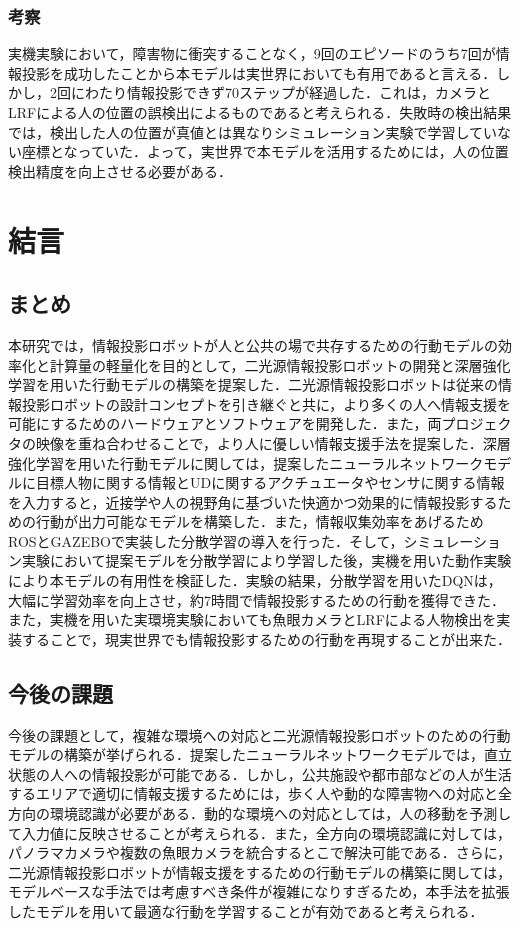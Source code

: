 \documentclass[12pt]{sonota/aislab}
\begin{document}
\subsection{考察}
実機実験において，障害物に衝突することなく，9回のエピソードのうち7回が情報投影を成功したことから本モデルは実世界においても有用であると言える．しかし，2回にわたり情報投影できず70ステップが経過した．これは，カメラとLRFによる人の位置の誤検出によるものであると考えられる．失敗時の検出結果では，検出した人の位置が真値とは異なりシミュレーション実験で学習していない座標となっていた．よって，実世界で本モデルを活用するためには，人の位置検出精度を向上させる必要がある．

\chapter{結言}
\section{まとめ}
本研究では，情報投影ロボットが人と公共の場で共存するための行動モデルの効率化と計算量の軽量化を目的として，二光源情報投影ロボットの開発と深層強化学習を用いた行動モデルの構築を提案した．二光源情報投影ロボットは従来の情報投影ロボットの設計コンセプトを引き継ぐと共に，より多くの人へ情報支援を可能にするためのハードウェアとソフトウェアを開発した．また，両プロジェクタの映像を重ね合わせることで，より人に優しい情報支援手法を提案した．深層強化学習を用いた行動モデルに関しては，提案したニューラルネットワークモデルに目標人物に関する情報とUDに関するアクチュエータやセンサに関する情報を入力すると，近接学や人の視野角に基づいた快適かつ効果的に情報投影するための行動が出力可能なモデルを構築した．また，情報収集効率をあげるためROSとGAZEBOで実装した分散学習の導入を行った．そして，シミュレーション実験において提案モデルを分散学習により学習した後，実機を用いた動作実験により本モデルの有用性を検証した．実験の結果，分散学習を用いたDQNは，大幅に学習効率を向上させ，約7時間で情報投影するための行動を獲得できた．また，実機を用いた実環境実験においても魚眼カメラとLRFによる人物検出を実装することで，現実世界でも情報投影するための行動を再現することが出来た．

\section{今後の課題}
今後の課題として，複雑な環境への対応と二光源情報投影ロボットのための行動モデルの構築が挙げられる．提案したニューラルネットワークモデルでは，直立状態の人への情報投影が可能である．しかし，公共施設や都市部などの人が生活するエリアで適切に情報支援するためには，歩く人や動的な障害物への対応と全方向の環境認識が必要がある．動的な環境への対応としては，人の移動を予測して入力値に反映させることが考えられる．また，全方向の環境認識に対しては，パノラマカメラや複数の魚眼カメラを統合するとこで解決可能である．さらに，二光源情報投影ロボットが情報支援をするための行動モデルの構築に関しては，モデルベースな手法では考慮すべき条件が複雑になりすぎるため，本手法を拡張したモデルを用いて最適な行動を学習することが有効であると考えられる．
\end{document}

